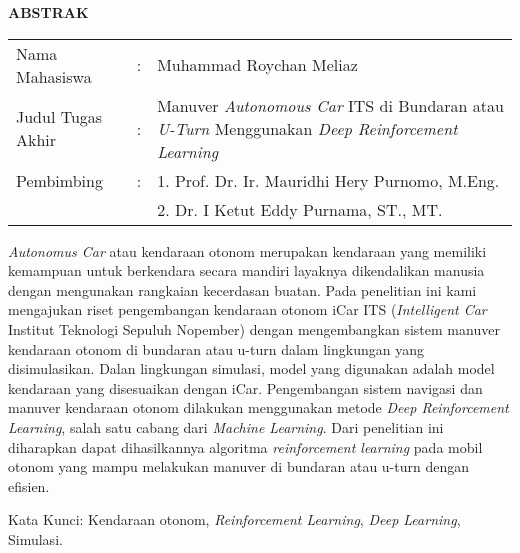 \begin{center}
  \large\textbf{ABSTRAK}
\end{center}


\vspace{2ex}

\begingroup
  \setlength{\tabcolsep}{0pt}

  \noindent
  \begin{tabularx}{\textwidth}{l >{\centering}m{2em} X}
    Nama Mahasiswa    &:& Muhammad Roychan Meliaz \\

    Judul Tugas Akhir &:&	Manuver \textit{Autonomous Car} ITS di Bundaran atau \textit{U-Turn} Menggunakan \textit{Deep Reinforcement Learning} \\

    Pembimbing        &:& 1. Prof. Dr. Ir. Mauridhi Hery Purnomo, M.Eng. \\
                      & & 2. Dr. I Ketut Eddy Purnama, ST., MT. \\
  \end{tabularx}
\endgroup

\textit{Autonomus Car }atau kendaraan otonom merupakan kendaraan yang memiliki kemampuan untuk berkendara secara mandiri layaknya dikendalikan manusia dengan mengunakan rangkaian kecerdasan buatan. Pada penelitian ini kami mengajukan riset pengembangan kendaraan otonom iCar ITS (\textit{Intelligent Car }Institut Teknologi Sepuluh Nopember) dengan mengembangkan sistem manuver kendaraan otonom di bundaran atau u-turn dalam lingkungan yang disimulasikan. Dalan lingkungan simulasi, model yang digunakan adalah model kendaraan yang disesuaikan dengan iCar. Pengembangan sistem navigasi dan manuver kendaraan otonom dilakukan menggunakan metode \textit{Deep Reinforcement Learning}, salah satu cabang dari \textit{Machine Learning}. Dari penelitian ini diharapkan dapat dihasilkannya algoritma \textit{reinforcement learning }pada mobil otonom yang mampu melakukan manuver di bundaran atau u-turn dengan efisien.

Kata Kunci: Kendaraan otonom, \textit{Reinforcement Learning}, \textit{Deep Learning}, Simulasi.
